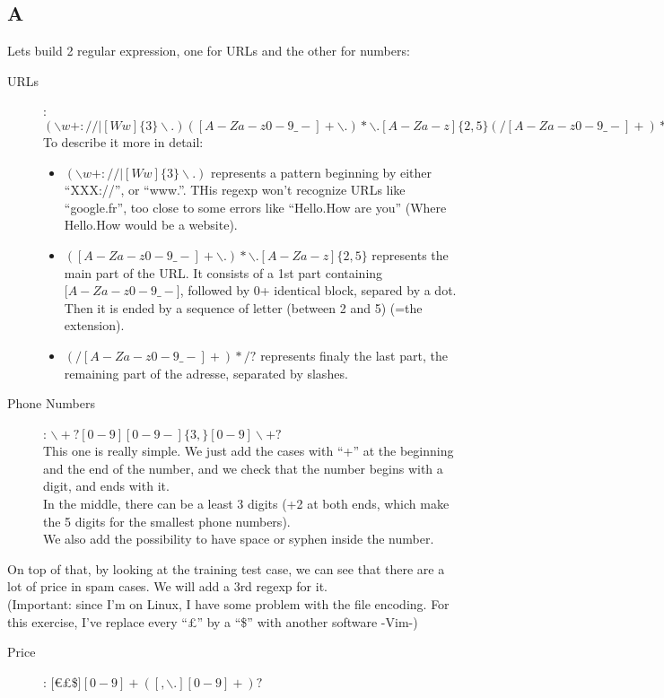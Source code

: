 \documentclass{article}
\begin{document}
        \subsection{A}
            Lets build 2 regular expression, one for URLs and the other for numbers:
            \begin{description}
                \item[URLs]: $(\backslash w+://|[Ww]\{3\}\backslash.)([A-Za-z0-9\_-]+\backslash .)*\backslash .[A-Za-z]\{2,5\}(/[A-Za-z0-9\_-]+)*/?$\\
                    To describe it more in detail:
                    \begin{itemize}
                        \item $(\backslash w+://|[Ww]\{3\}\backslash.)$ represents a pattern beginning by either ``XXX://'', or ``www.''. THis regexp won't recognize URLs like ``google.fr'', too close to some errors like ``Hello.How are you'' (Where Hello.How would be a website).
                        \item $([A-Za-z0-9\_-]+\backslash .)*\backslash .[A-Za-z]\{2,5\}$ represents the main part of the URL. It consists of a 1st part containing $[A-Za-z0-9\_-$], followed by 0+ identical block, separed by a dot. Then it is ended by a sequence of letter (between 2 and 5) (=the extension).
                        \item $(/[A-Za-z0-9\_-]+)*/?$ represents finaly the last part, the remaining part of the adresse, separated by slashes.
                    \end{itemize}
                \item[Phone Numbers]: $\backslash+?[0-9][0-9 -]\{3,\}[0-9]\backslash+?$\\
                    This one is really simple. We just add the cases with ``+'' at the beginning and the end of the number, and we check that the number begins with a digit, and ends with it.\\
                    In the middle, there can be a least 3 digits (+2 at both ends, which make the 5 digits for the smallest phone numbers).\\
                    We also add the possibility to have space or syphen inside the number.
            \end{description}
            On top of that, by looking at the training test case, we can see that there are a lot of price in spam cases. We will add a 3rd regexp for it.\\
            (Important: since I'm on Linux, I have some problem with the file encoding. For this exercise, I've replace every ``£'' by a ``\$'' with another software -Vim-)
            \begin{description}
                \item[Price]: $[$\euro£\$$][0-9]+([,\backslash.][0-9]+)?$
            \end{description}
\end{document}
